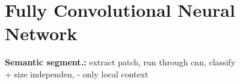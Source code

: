 \section{Fully Convolutional Neural Network}

\textbf{Semantic segment.:} extract patch, run through cnn, classify\\
+ size independen, - only local context

